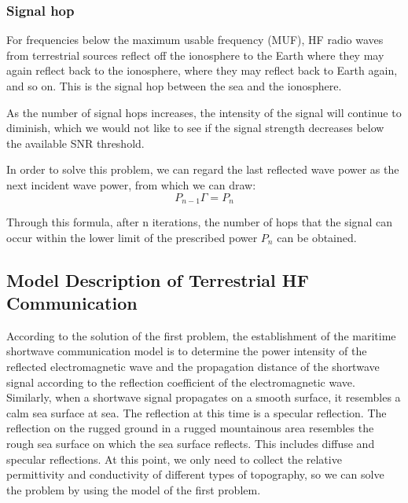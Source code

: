 \documentclass{mcmthesis}
\begin{document}
\subsubsection{Signal hop}%
For frequencies below the maximum usable frequency (MUF), HF radio waves from terrestrial sources reflect off the ionosphere to the Earth where they may again reflect back to the ionosphere, where they may reflect back to Earth again, and so on. This is the signal hop between the sea and the ionosphere.

As the number of signal hops increases, the intensity of the signal will continue to diminish, which we would not like to see if the signal strength decreases below the available SNR threshold.

In order to solve this problem, we can regard the last reflected wave power as the next incident wave power, from which we can draw:
\begin{equation}
P_{n-1}\Gamma=P_n
\end{equation}

Through this formula, after n iterations, the number of hops that the signal can occur within the lower limit of the prescribed power $P_{n}$ can be obtained.

\subsection{Model Description of Terrestrial HF Communication}%
According to the solution of the first problem, the establishment of the maritime shortwave communication model is to determine the power intensity of the reflected electromagnetic wave and the propagation distance of the shortwave signal according to the reflection coefficient of the electromagnetic wave. Similarly, when a shortwave signal propagates on a smooth surface, it resembles a calm sea surface at sea. The reflection at this time is a specular reflection. The reflection on the rugged ground in a rugged mountainous area resembles the rough sea surface on which the sea surface reflects. This includes diffuse and specular reflections. At this point, we only need to collect the relative permittivity and conductivity of different types of topography, so we can solve the problem by using the model of the first problem.
\end{document}
